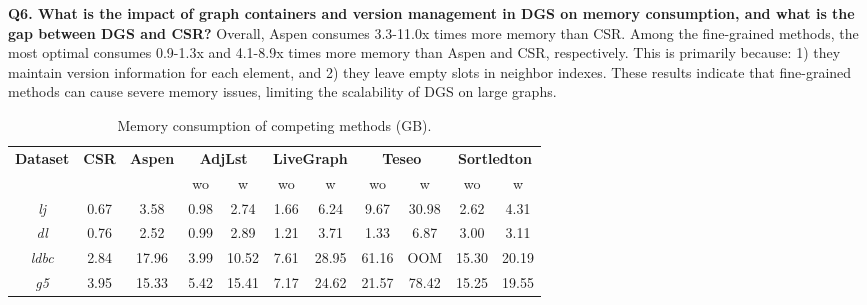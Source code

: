 \vspace{2pt}
\noindent\textbf{Q6. What is the impact of graph containers and version management in DGS on memory consumption, and what is the gap between DGS and CSR?} Overall, Aspen consumes 3.3-11.0x times more memory than CSR. Among the fine-grained methods, the most optimal consumes 0.9-1.3x and 4.1-8.9x times more memory than Aspen and CSR, respectively. This is primarily because: 1) they maintain version information for each element, and 2) they leave empty slots in neighbor indexes. These results indicate that fine-grained methods can cause severe memory issues, limiting the scalability of DGS on large graphs.






\small
\begin{table}[htbp]
\captionsetup{skip=0pt}
\setlength{\abovecaptionskip}{0pt}
\setlength{\belowcaptionskip}{0pt}
    \caption{Memory consumption of competing methods (GB).}
    \label{tab:memory_consumption}
    \begin{tabular}{|c|c|c|cc|cc|cc|cc|}
\hline
\multirow{2}{*}{\textbf{Dataset}} &
  \multirow{2}{*}{\textbf{CSR}} &
  \multirow{2}{*}{\textbf{Aspen}} &
  \multicolumn{2}{c|}{\textbf{AdjLst}} &
  \multicolumn{2}{c|}{\textbf{LiveGraph}} &
  \multicolumn{2}{c|}{\textbf{Teseo}} &
  \multicolumn{2}{c|}{\textbf{Sortledton}} \\ \cline{4-11} 
          &      &       & \multicolumn{1}{c|}{wo}   & w     & \multicolumn{1}{c|}{wo}   & w     & \multicolumn{1}{c|}{wo}    & w     & \multicolumn{1}{c|}{wo}    & w     \\ \hline
\emph{lj}   & 0.67 & 3.58  & \multicolumn{1}{c|}{0.98} & 2.74  & \multicolumn{1}{c|}{1.66} & 6.24  & \multicolumn{1}{c|}{9.67}  & 30.98 & \multicolumn{1}{c|}{2.62}  & 4.31  \\ \hline
\emph{dl}   & 0.76 & 2.52  & \multicolumn{1}{c|}{0.99} & 2.89  & \multicolumn{1}{c|}{1.21} & 3.71  & \multicolumn{1}{c|}{1.33}  & 6.87  & \multicolumn{1}{c|}{3.00}  & 3.11  \\ \hline
\emph{ldbc}   & 2.84 & 17.96 & \multicolumn{1}{c|}{3.99} & 10.52 & \multicolumn{1}{c|}{7.61} & 28.95 & \multicolumn{1}{c|}{61.16} & OOM   & \multicolumn{1}{c|}{15.30} & 20.19 \\ \hline
\emph{g5} & 3.95 & 15.33 & \multicolumn{1}{c|}{5.42} & 15.41 & \multicolumn{1}{c|}{7.17} & 24.62 & \multicolumn{1}{c|}{21.57} & 78.42 & \multicolumn{1}{c|}{15.25} & 19.55 \\ \hline

\end{tabular}
\end{table}
